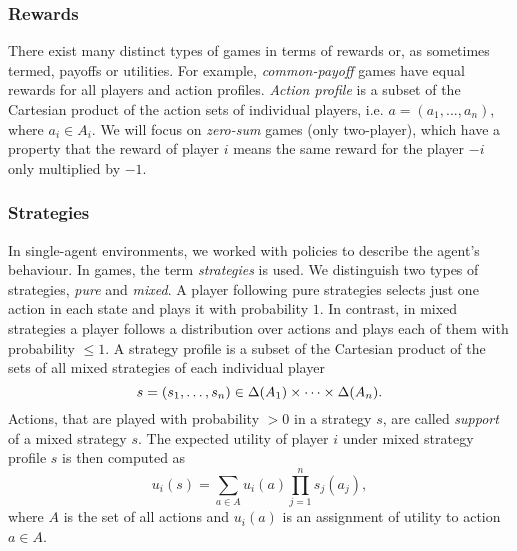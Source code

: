 \documentclass[../main.tex]{subfiles}
\begin{document}
\subsubsection{Rewards}\label{bg:g:basics:rewards}
There exist many distinct types of games in terms of rewards or, as sometimes termed, payoffs or utilities.
For example, \textit{common-payoff} games have equal rewards for all players and action profiles.
\textit{Action profile} is a subset of the Cartesian product of the action sets of individual players, i.e. $a = (a_1, ..., a_n)$, where $a_i \in A_i$.
We will focus on \textit{zero-sum} games (only two-player), which have a property that the reward of player $i$ means the same reward for the player $-i$ only multiplied by $-1$.

\subsubsection{Strategies}\label{bg:g:basics:strategies}
In single-agent environments, we worked with policies to describe the agent's behaviour.
In games, the term \textit{strategies} is used.
We distinguish two types of strategies, \textit{pure} and \textit{mixed}.
A player following pure strategies selects just one action in each state and plays it with probability $1$.
In contrast, in mixed strategies a player follows a distribution over actions and plays each of them with probability $\leq 1$.
A strategy profile is a subset of the Cartesian product of the sets of all mixed strategies of each individual player
\begin{equation}\label{bg:g:basics:strategies:profiles}
    s = (s_1, \dots, s_n) \in \Delta(A_1) \times \cdots \times \Delta(A_n).
\end{equation}
Actions, that are played with probability $> 0$ in a strategy $s$, are called \textit{support} of a mixed strategy $s$.
The expected utility of player $i$ under mixed strategy profile $s$ is then computed as
\begin{equation}\label{bg:g:basics:strategies:util}
    u_i(s) = \sum_{a \in A}u_i(a)\prod_{j = 1}^{n}s_j(a_j),
\end{equation}
where $A$ is the set of all actions and $u_i(a)$ is an assignment of utility to action $a \in A$.
\end{document}
